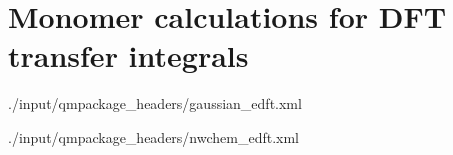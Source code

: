 \section{Monomer calculations for DFT transfer integrals}
 {./input/qmpackage_headers/gaussian_edft.xml}

 {./input/qmpackage_headers/nwchem_edft.xml}